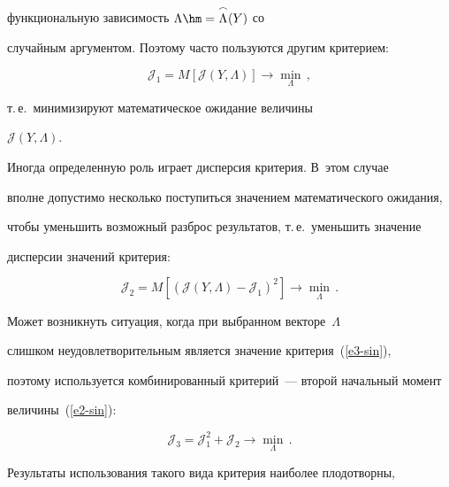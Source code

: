 функциональную зависимость $\Lambda \hm= \overset{\frown}{\Lambda}(Y)$ со

случайным аргументом. Поэтому часто пользуются другим критерием:

     \begin{equation}

     \mathcal{J}_1=M\left[ \mathcal{J}(Y,\Lambda)\right] \to \min\limits_\Lambda\,,

     \label{e3-sin}

     \end{equation}

т.\,е.\ минимизируют математическое ожидание величины

$\mathcal{J}(Y,\Lambda)$.



     Иногда определенную роль играет дисперсия критерия. В~этом случае

вполне допустимо несколько поступиться значением математического ожидания,

чтобы уменьшить возможный разброс результатов, т.\,е.\ уменьшить значение

дисперсии значений критерия:

     \begin{equation*}

     \mathcal{J}_2= M\left[ (\mathcal{J}(Y,\Lambda) -\mathcal{J}_1)^2\right] \to

\min\limits_\Lambda\,.


     \end{equation*}



     Может возникнуть ситуация, когда при выбранном векторе~$\Lambda$

слишком неудовлетворительным является значение критерия~(\ref{e3-sin}),

поэтому используется комбинированный критерий~--- второй начальный момент

величины~(\ref{e2-sin}):

     \begin{equation}

     \mathcal{J}_3= \mathcal{J}_1^2+\mathcal{J}_2\to \min\limits_\Lambda\,.

     \label{e5-sin}

     \end{equation}



     Результаты использования такого вида критерия наиболее плодотворны,

